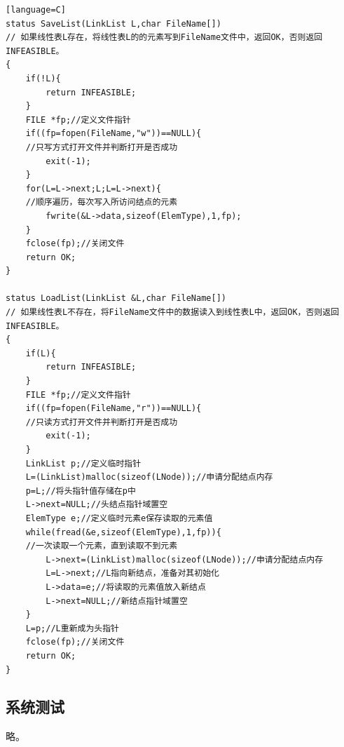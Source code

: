 \documentclass[supercite]{Experimental_Report}
\theoremstyle{definition}
\begin{document}
\begin{sloppypar}
\begin{lstlisting}[breaklines][language=C]
status SaveList(LinkList L,char FileName[])
// 如果线性表L存在，将线性表L的的元素写到FileName文件中，返回OK，否则返回INFEASIBLE。
{
    if(!L){
        return INFEASIBLE;
    }
    FILE *fp;//定义文件指针
    if((fp=fopen(FileName,"w"))==NULL){
    //只写方式打开文件并判断打开是否成功
        exit(-1);
    }
    for(L=L->next;L;L=L->next){
    //顺序遍历，每次写入所访问结点的元素
        fwrite(&L->data,sizeof(ElemType),1,fp);
    }
    fclose(fp);//关闭文件
    return OK;
}

status LoadList(LinkList &L,char FileName[])
// 如果线性表L不存在，将FileName文件中的数据读入到线性表L中，返回OK，否则返回INFEASIBLE。
{
    if(L){
        return INFEASIBLE;
    }
    FILE *fp;//定义文件指针
    if((fp=fopen(FileName,"r"))==NULL){
    //只读方式打开文件并判断打开是否成功
        exit(-1);
    }
    LinkList p;//定义临时指针
    L=(LinkList)malloc(sizeof(LNode));//申请分配结点内存
    p=L;//将头指针值存储在p中
    L->next=NULL;//头结点指针域置空
    ElemType e;//定义临时元素e保存读取的元素值
    while(fread(&e,sizeof(ElemType),1,fp)){
    //一次读取一个元素，直到读取不到元素
        L->next=(LinkList)malloc(sizeof(LNode));//申请分配结点内存
        L=L->next;//L指向新结点，准备对其初始化
        L->data=e;//将读取的元素值放入新结点
        L->next=NULL;//新结点指针域置空
    }
    L=p;//L重新成为头指针
    fclose(fp);//关闭文件
    return OK;
}

\end{lstlisting}

\subsection{系统测试}
略。

\end{sloppypar}
\end{document}
